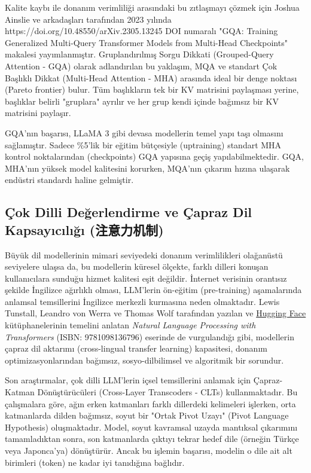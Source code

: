 \documentclass[11pt,a4paper]{article}
\begin{document}
Kalite kaybı ile donanım verimliliği arasındaki bu zıtlaşmayı çözmek için Joshua Ainslie ve arkadaşları tarafından 2023 yılında https://doi.org/10.48550/arXiv.2305.13245 DOI numaralı "GQA: Training Generalized Multi-Query Transformer Models from Multi-Head Checkpoints" makalesi yayımlanmıştır. Gruplandırılmış Sorgu Dikkati (Grouped-Query Attention - GQA) olarak adlandırılan bu yaklaşım, MQA ve standart Çok Başlıklı Dikkat (Multi-Head Attention - MHA) arasında ideal bir denge noktası (Pareto frontier) bulur. Tüm başlıkların tek bir KV matrisini paylaşması yerine, başlıklar belirli "gruplara" ayrılır ve her grup kendi içinde bağımsız bir KV matrisini paylaşır.

GQA'nın başarısı, LLaMA 3 gibi devasa modellerin temel yapı taşı olmasını sağlamıştır. Sadece \%5'lik bir eğitim bütçesiyle (uptraining) standart MHA kontrol noktalarından (checkpoints) GQA yapısına geçiş yapılabilmektedir. GQA, MHA'nın yüksek model kalitesini korurken, MQA'nın çıkarım hızına ulaşarak endüstri standardı haline gelmiştir.

\subsection{Çok Dilli Değerlendirme ve Çapraz Dil Kapsayıcılığı (注意力机制)}
Büyük dil modellerinin mimari seviyedeki donanım verimlilikleri olağanüstü seviyelere ulaşsa da, bu modellerin küresel ölçekte, farklı dilleri konuşan kullanıcılara sunduğu hizmet kalitesi eşit değildir. İnternet verisinin orantısız şekilde İngilizce ağırlıklı olması, LLM'lerin ön-eğitim (pre-training) aşamalarında anlamsal temsillerini İngilizce merkezli kurmasına neden olmaktadır. Lewis Tunstall, Leandro von Werra ve Thomas Wolf tarafından yazılan ve \href{https://huggingface.co}{Hugging Face} kütüphanelerinin temelini anlatan \textit{Natural Language Processing with Transformers} (ISBN: 9781098136796) eserinde de vurgulandığı gibi, modellerin çapraz dil aktarımı (cross-lingual transfer learning) kapasitesi, donanım optimizasyonlarından bağımsız, sosyo-dilbilimsel ve algoritmik bir sorundur.

Son araştırmalar, çok dilli LLM'lerin içsel temsillerini anlamak için Çapraz-Katman Dönüştürücüleri (Cross-Layer Transcoders - CLTs) kullanmaktadır. Bu çalışmalara göre, ağın erken katmanları farklı dillerdeki kelimeleri işlerken, orta katmanlarda dilden bağımsız, soyut bir "Ortak Pivot Uzayı" (Pivot Language Hypothesis) oluşmaktadır. Model, soyut kavramsal uzayda mantıksal çıkarımını tamamladıktan sonra, son katmanlarda çıktıyı tekrar hedef dile (örneğin Türkçe veya Japonca'ya) dönüştürür. Ancak bu işlemin başarısı, modelin o dile ait alt birimleri (token) ne kadar iyi tanıdığına bağlıdır.
\end{document}
